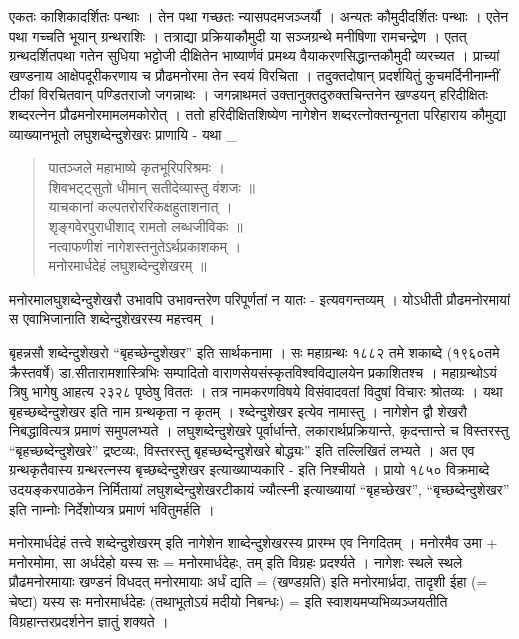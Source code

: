 एकतः काशिकादर्शितः पन्थाः । तेन पथा गच्छतः न्यासपदमजञ्जर्यौ । अन्यतः कौमुदीदर्शितः पन्थाः । एतेन पथा गच्चति भूयान् ग्रन्थराशिः । तत्राद्या प्रक्रियाकौमुदी या सञ्जग्रन्थे मनीषिणा रामचन्द्रेण । एतत् ग्रन्थदर्शितपथा गतेन सुधिया भट्टोजी दीक्षितेन भाष्यार्णवं प्रमथ्य वैयाकरणसिद्धान्तकौमुदी व्यरच्यत । प्राच्यां खण्डनाय आक्षेपदूरीकरणाय च प्रौढमनोरमा तेन स्वयं विरचिता । तदुक्तदोषान् प्रदर्शयितुं कुचमर्दिनीनाम्नीं टीकां विरचितवान् पण्डितराजो जगन्नाथः । जगन्नाथमतं उक्तानुक्तदुरुक्तचिन्तनेन खण्डयन् हरिदीक्षितः शब्दरत्नेन प्रौढमनोरमामलमकोरोत् । ततो हरिदीक्षितशिष्येण नागेशेन शब्दरत्नोक्तन्यूनता परिहाराय कौमुद्या व्याख्यानभूतो लघुशब्देन्दुशेखरः प्राणायि - यथा _

\begin{verse}
पातञ्जले महाभाष्ये कृतभूरिपरिश्रमः ।\\
शिवभट्ट्सुतो धीमान् सतीदेव्यास्तु वंशजः ॥\\
याचकानां कल्पतरोररिकक्षहुताशनात् ।\\
शृङ्गवेरपुराधीशाद् रामतो लब्धजीविकः ॥\\
नत्वाफणीशं नागेशस्तनुतेऽर्थप्रकाशकम् ।\\
मनोरमार्धदेहं लघुशब्देन्दुशेखरम् ॥
\end{verse}

मनोरमालघुशब्देन्दुशेखरौ उभावपि उभावन्तरेण परिपूर्णतां न यातः - इत्यवगन्तव्यम् । योऽधीती प्रौढमनोरमायां स एवाभिजानाति शब्देन्दुशेखरस्य महत्त्वम् ।

बृहन्नसौ शब्देन्दुशेखरो “बृहच्छेन्दुशेखर” इति सार्थकनामा । सः महाग्रन्थः १८८२ तमे शकाब्दे (१९६०तमे क्रैस्तवर्षे) डा.सीतारामशास्त्रिभिः सम्पादितो वाराणसेयसंस्कृतविश्वविद्यालयेन प्रकाशितश्च । महाग्रन्थोऽयं त्रिषु भागेषु आहत्य २३२८ पृष्ठेषु विततः । तत्र नामकरणविषये विसंवादवतां विदुषां विचारः श्रोतव्यः । यथा बृहच्छब्देन्दुशेखर इति नाम ग्रन्थकृता न कृतम् । श्ब्देन्दुशेखर इत्येव नामास्तु । नागेशेन द्वौ शेखरौ निबद्धावित्यत्र प्रमाणं समुपलभ्यते । लघुशब्देन्दुशेखरे पूर्वार्धान्ते, लकारार्थप्रक्रियान्ते, कृदन्तान्ते च विस्तरस्तु “बृहच्छब्देन्दुशेखरे” द्रष्टव्यः, विस्तरस्तु बृहच्छब्देन्दुशेखरे बोद्ध्यः” इति तल्लिखितं लभ्यते । अत एव ग्रन्थकृतैवास्य ग्रन्थरत्नस्य बृच्छब्देन्दुशेखर इत्याख्याप्यकारि - इति निश्चीयते । प्रायो १८५० विक्रमाब्दे उदयङ्करपाठकेन निर्मितायां लघुशब्देन्दुशेखरटीकायं ज्यौत्स्नी इत्याख्यायां “बृहच्छेखर”, “बृच्छब्देन्दुशेखर” इति नाम्नोः निर्देशोप्यत्र प्रमाणं भवितुमर्हति ।

मनोरमार्धदेहं तत्त्वे शब्देन्दुशेखरम् इति नागेशेन शाब्देन्दुशेखरस्य प्रारम्भ एव निगदितम् । मनोरमैव उमा + मनोरमोमा, सा अर्धदेहो यस्य सः = मनोरमार्धदेहः, तम् इति विग्रहः प्रदर्श्यते । नागेशः स्थले स्थले प्रौढमनोरमायाः खण्डनं विधदत् मनोरमायाः अर्धं द्यति = (खण्डय़ति) इति मनोरमार्ध्रदा, तादृशी ईहा (= चेष्टा) यस्य सः मनोरमार्धदेहः (तथाभूतोऽयं मदीयो निबन्धः) = इति स्वाशयमप्यभिव्यञ्जयतीति विग्रहान्तरप्रदर्शनेन ज्ञातुं शक्यते ।

